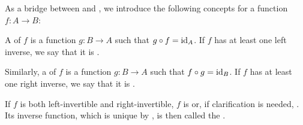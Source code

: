 \begin{definition}\label{def:function_invertibility_categorical}
  As a bridge between  and , we introduce the following concepts for a function \( f: A \to B \):
  \begin{thmenum}
     A  of \( f \) is a function \( g: B \to A \) such that \( g \mathbin \circ f = \operatorname{id}_A \). If \( f \) has at least one left inverse, we say that it is .

     Similarly, a  of \( f \) is a function \( g: B \to A \) such that \( f \mathbin \circ g = \operatorname{id}_B \). If \( f \) has at least one right inverse, we say that it is .

     If \( f \) is both left-invertible and right-invertible, \( f \) is  or, if clarification is needed, . Its inverse function, which is unique by , is then called the .
  \end{thmenum}
\end{definition}

